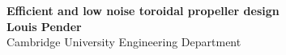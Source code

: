 \documentclass[a2,portrait]{a0poster}
\begin{document}

\begin{center}
\begin{minipage}{0.75\textwidth}
\centering
\huge \color{NavyBlue} \textbf{Efficient and low noise toroidal propeller design} \color{Black}\\ %
\large \textbf{Louis Pender}\\[0.5cm] %
\large Cambridge University Engineering Department\\ %
\end{minipage}
\end{center}


\vspace{1cm}
\end{document}
